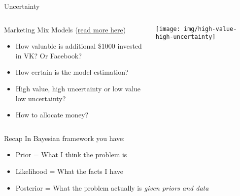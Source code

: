 \documentclass{beamer}
\begin{document}
\begin{frame}{Uncertainty}
\begin{columns}
\begin{column}{0.5\linewidth}
Marketing Mix Models (\href{https://engineering.hellofresh.com/bayesian-media-mix-modeling-using-pymc3-for-fun-and-profit-2bd4667504e6}{read more here})
    \begin{itemize}
        \item How valuable is additional \$1000 invested in VK? Or Facebook?
        \item How certain is the model estimation?
        \item High value, high uncertainty or low value low uncertainty?
        \item How to allocate money?
    \end{itemize}
\end{column}
\begin{column}{0.5\linewidth}
\texttt{[image: img/high-value-high-uncertainty]}
\end{column}
\end{columns}
\end{frame}
\begin{frame}{Recap}
    In Bayesian framework you have:
    \begin{itemize}
        \item Prior = What I think the problem is
        \item Likelihood = What the facts I have
        \item Posterior = What the problem actually is \textit{given priors and data}
    \end{itemize}
\end{frame}
\end{document}
